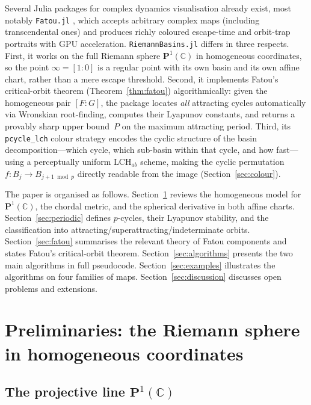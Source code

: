 \documentclass[12pt]{article}
\theoremstyle{definition}
\newcommand{\C}{\mathbb{C}}
\newcommand{\Pone}{\mathbf{P}^1(\C)}
\newcommand{\hpair}{[F:G]}
\begin{document}
Several Julia packages for complex dynamics visualisation already exist,
most notably \texttt{Fatou.jl} \cite{FatouJl}, which accepts arbitrary
complex maps (including transcendental ones) and produces richly coloured
escape-time and orbit-trap portraits with GPU acceleration.
\texttt{RiemannBasins.jl} differs in three respects.
First, it works on the full Riemann sphere $\Pone$ in homogeneous
coordinates, so the point $\infty=[1:0]$ is a regular point with its own
basin and its own affine chart, rather than a mere escape threshold.
Second, it implements Fatou's critical-orbit theorem
(Theorem~\ref{thm:fatou}) algorithmically: given the homogeneous pair
$\hpair$, the package locates \emph{all} attracting cycles automatically
via Wronskian root-finding, computes their Lyapunov constants, and returns
a provably sharp upper bound~$P$ on the maximum attracting period.
Third, its \texttt{pcycle\_lch} colour strategy encodes the cyclic
structure of the basin decomposition---which cycle, which sub-basin within
that cycle, and how fast---using a perceptually uniform
$\mathrm{LCH}_{ab}$ scheme, making the cyclic permutation
$f\colon B_j\to B_{j+1\bmod p}$ directly readable from the image
(Section~\ref{sec:colour}).

The paper is organised as follows.
Section~\ref{sec:prelim} reviews the homogeneous model for $\Pone$, the
chordal metric, and the spherical derivative in both affine charts.
Section~\ref{sec:periodic} defines $p$-cycles, their Lyapunov stability, and
the classification into attracting/superattracting/indeterminate orbits.
Section~\ref{sec:fatou} summarises the relevant theory of Fatou components and
states Fatou's critical-orbit theorem.
Section~\ref{sec:algorithms} presents the two main algorithms in full
pseudocode.
Section~\ref{sec:examples} illustrates the algorithms on four families of
maps.
Section~\ref{sec:discussion} discusses open problems and extensions.

\section{Preliminaries: the Riemann sphere in homogeneous coordinates}
\label{sec:prelim}

\subsection{The projective line $\Pone$}
\end{document}
